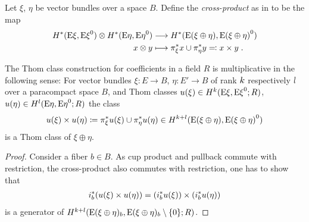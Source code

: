 \begin{Def}
  Let $\xi$, $\eta$ be vector bundles over a space $B$.
  Define the \emph{cross-product} as in \cite[p.~214]{hatcher} to be
  the map
    \begin{align*}
      H^*(\mathrm{E}\xi, {\mathrm{E}\xi}^0)
      \otimes
      H^*(\mathrm{E}\eta, {\mathrm{E}\eta}^0)
      &\longrightarrow
        H^*(\mathrm{E}(\xi\oplus\eta), {\mathrm{E}(\xi\oplus\eta)}^0)\\
      x\otimes y
      &\longmapsto
        {\pi}^*_\xi x \cup {\pi}^*_\eta y
        \eqqcolon x\times y
        \;.
    \end{align*}
\end{Def}
\begin{Cor}\label{cor:thomclassmultiplicative}
  The Thom class construction for coefficients in a field $R$ is
  multiplicative in the following sense:
  For vector bundles $\xi\colon E\to B$, $\eta\colon E'\to B$
  of rank $k$ respectively $l$ over a paracompact space $B$, and Thom
  classes
  ${u}(\xi)\in H^{k}(\mathrm{E}\xi, {\mathrm{E}\xi}^0; R)$,
  ${u}(\eta)\in H^{l}(\mathrm{E}\eta, {\mathrm{E}\eta}^0; R)$
  the class
  \begin{gather*}
    {u}(\xi)\times{u}(\eta)
    \coloneqq {\pi}^*_\xi{u}(\xi) \cup {\pi}^*_\eta{u}(\eta)
    \in H^{k+l}(\mathrm{E}(\xi\oplus\eta), {\mathrm{E}(\xi\oplus\eta)}^0)
  \end{gather*}
  is a Thom class of $\xi\oplus\eta$.
  \begin{proof}
    Consider a fiber $b\in B$. As cup product and pullback commute
    with restriction, the cross-product also commutes with
    restriction, \idest one has to show that
    \begin{gather*}
      {i}^*_b({u}(\xi)\times{u}(\eta))
      = \left({i}^*_b{u}(\xi)\right)
      \times \left({i}^*_b{u}(\eta)\right)
    \end{gather*}
    is a generator of
    $H^{k+l}(\mathrm{E}(\xi\oplus\eta)_b, {\mathrm{E}(\xi\oplus\eta)_b}\setminus\{0\};R)$.

\end{proof}
\end{Cor}
